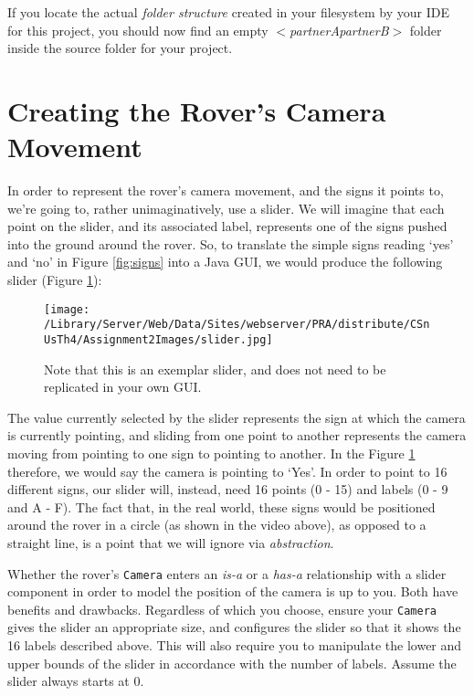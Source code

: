 \documentclass[11pt]{article}
\begin{document}
If you locate the actual \emph{folder structure} created in your filesystem by your IDE for this project, you should now find an empty $<$\emph{partnerApartnerB}$>$ folder inside the source folder for your project. 

\section{Creating the Rover's Camera Movement}
\label{section:camera}

In order to represent the rover's camera movement, and the signs it points to, we're going to, rather unimaginatively, use a slider. We will imagine that each point on the slider, and its associated label, represents one of the signs pushed into the ground around the rover. So, to translate the simple signs reading `yes' and `no' in Figure \ref{fig:signs} into a Java GUI, we would produce the following slider (Figure \ref{fig:slider}):

\begin{figure}[htbp]
\begin{center}
\texttt{[image: /Library/Server/Web/Data/Sites/webserver/PRA/distribute/CSnUsTh4/Assignment2Images/slider.jpg]}
\caption{Note that this is an exemplar slider, and does not need to be replicated in your own GUI.}
\label{fig:slider}
\end{center}
\end{figure}

The value currently selected by the slider represents the sign at which the camera is currently pointing, and sliding from one point to another represents the camera moving from pointing to one sign to pointing to another. In the Figure \ref{fig:slider} therefore, we would say the camera is pointing to `Yes'. In order to point to 16 different signs, our slider will, instead, need 16 points (0 - 15) and labels (0 - 9 and A - F). The fact that, in the real world, these signs would be positioned around the rover in a circle (as shown in the video above), as opposed to a straight line, is a point that we will ignore via \emph{abstraction}. 

Whether the rover's \texttt{Camera} enters an \emph{is-a} or a \emph{has-a} relationship with a slider component in order to model the position of the camera is up to you. Both have benefits and drawbacks. Regardless of which you choose, ensure your \texttt{Camera} gives the slider an appropriate size, and configures the slider so that it shows the 16 labels described above. This will also require you to manipulate the lower and upper bounds of the slider in accordance with the number of labels. Assume the slider always starts at 0.
\end{document}
